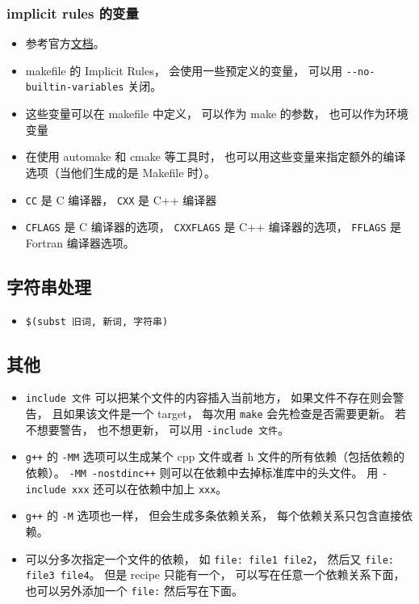 \subsubsection{implicit rules 的变量}
\begin{itemize}
\item 参考官方\href{https://www.gnu.org/software/make/manual/html_node/Implicit-Variables.html}{文档}。
\item makefile 的 Implicit Rules， 会使用一些预定义的变量， 可以用 \verb|--no-builtin-variables| 关闭。
\item 这些变量可以在 makefile 中定义， 可以作为 make 的参数， 也可以作为环境变量
\item 在使用 automake 和 cmake 等工具时， 也可以用这些变量来指定额外的编译选项（当他们生成的是 Makefile 时）。
\item \verb|CC| 是 C 编译器， \verb|CXX| 是 C++ 编译器
\item \verb|CFLAGS| 是 C 编译器的选项， \verb|CXXFLAGS| 是 C++ 编译器的选项， \verb|FFLAGS| 是 Fortran 编译器选项。
\end{itemize}

\subsection{字符串处理}
\begin{itemize}
\item \verb|$(subst 旧词, 新词, 字符串)|
\end{itemize}


\subsection{其他}
\begin{itemize}
\item \verb|include 文件| 可以把某个文件的内容插入当前地方， 如果文件不存在则会警告， 且如果该文件是一个 target， 每次用 \verb|make| 会先检查是否需要更新。 若不想要警告， 也不想更新， 可以用 \verb|-include 文件|。
\item \verb|g++| 的 \verb|-MM| 选项可以生成某个 cpp 文件或者 h 文件的所有依赖（包括依赖的依赖）。 \verb|-MM -nostdinc++| 则可以在依赖中去掉标准库中的头文件。 用 \verb|-include xxx| 还可以在依赖中加上 \verb|xxx|。
\item \verb|g++| 的 \verb|-M| 选项也一样， 但会生成多条依赖关系， 每个依赖关系只包含直接依赖。
\item 可以分多次指定一个文件的依赖， 如 \verb|file: file1 file2|， 然后又 \verb|file: file3 file4|。 但是 recipe 只能有一个， 可以写在任意一个依赖关系下面， 也可以另外添加一个 \verb|file:| 然后写在下面。
\end{itemize}
